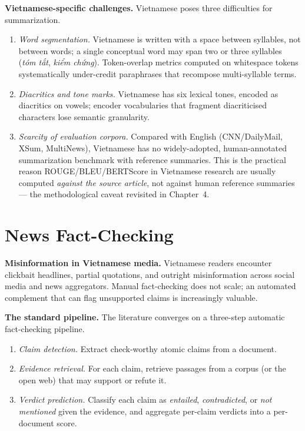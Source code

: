 \textbf{Vietnamese-specific challenges.}
Vietnamese poses three difficulties for summarization.
\begin{enumerate}
  \item \textit{Word segmentation.} Vietnamese is written with a space
        between syllables, not between words; a single conceptual word may
        span two or three syllables (\textit{tóm tắt}, \textit{kiểm chứng}).
        Token-overlap metrics computed on whitespace tokens systematically
        under-credit paraphrases that recompose multi-syllable terms.
  \item \textit{Diacritics and tone marks.} Vietnamese has six lexical tones,
        encoded as diacritics on vowels; encoder vocabularies that fragment
        diacriticised characters lose semantic granularity.
  \item \textit{Scarcity of evaluation corpora.} Compared with English
        (CNN/DailyMail, XSum, MultiNews), Vietnamese has no widely-adopted,
        human-annotated summarization benchmark with reference summaries.
        This is the practical reason ROUGE/BLEU/BERTScore in Vietnamese
        research are usually computed \textit{against the source article},
        not against human reference summaries --- the methodological caveat
        revisited in Chapter~4.
\end{enumerate}

\section{News Fact-Checking}

\textbf{Misinformation in Vietnamese media.}
Vietnamese readers encounter clickbait headlines, partial quotations, and
outright misinformation across social media and news aggregators. Manual
fact-checking does not scale; an automated complement that can flag
unsupported claims is increasingly valuable.

\textbf{The standard pipeline.}
The literature converges on a three-step automatic fact-checking pipeline.
\begin{enumerate}
  \item \textit{Claim detection.} Extract check-worthy atomic claims from a
        document.
  \item \textit{Evidence retrieval.} For each claim, retrieve passages from
        a corpus (or the open web) that may support or refute it.
  \item \textit{Verdict prediction.} Classify each claim as \textit{entailed},
        \textit{contradicted}, or \textit{not mentioned} given the evidence,
        and aggregate per-claim verdicts into a per-document score.
\end{enumerate}

